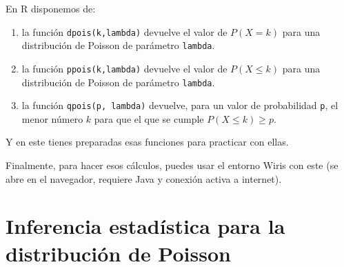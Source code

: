 \begin{itemize}
      En R disponemos de:
      \begin{enumerate}
        \item la función {\tt dpois(k,lambda)} devuelve el valor de $P(X=k)$ para una distribución de Poisson de parámetro {\tt lambda}.
        \item la función {\tt ppois(k,lambda)} devuelve el valor de $P(X\leq k)$ para una distribución de Poisson de parámetro {\tt lambda}.
        \item la función {\tt qpois(p, lambda)} devuelve, para un valor de probabilidad {\tt p}, el {\sf menor número $k$} para que el que se cumple $P(X\leq k)\geq p$.
      \end{enumerate}
      Y en este  tienes preparadas esas funciones para practicar con ellas.

      Finalmente, para hacer esos cálculos, puedes usar el entorno Wiris con este  (se abre en el navegador, requiere Java y conexión activa a internet).

    \end{itemize}


\section{Inferencia estadística para la distribución de Poisson}

